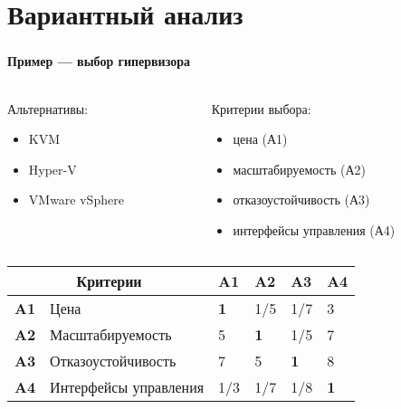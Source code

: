 
\section{Вариантный анализ}

\begin{frame}
\frametitle{\insertsection}
\framesubtitle{Пример --- выбор гипервизора}

\begin{columns}
    \begin{column}{0.45\textwidth}
        Альтернативы:
        \vspace{\baselineskip}
        \begin{itemize}
            \item KVM
            \item Hyper-V
            \item VMware vSphere
        \end{itemize}
    \end{column}
    \begin{column}{0.55\textwidth}
        Критерии выбора:
        \begin{itemize}
            \item цена (А1)
            \item масштабируемость (А2)
            \item отказоустойчивость (А3)
            \item интерфейсы управления (А4)
        \end{itemize}
    \end{column}
\end{columns}

\begin{table}
    \begin{tabular}{|l|l|l|l|l|l|}
      \hline \multicolumn{2}{|c|}{\textbf{Критерии}} & \textbf{A1} & \textbf{A2} & \textbf{A3} & \textbf{A4} \\
      \hline \textbf{A1} & Цена & \textbf{1} & 1/5 & 1/7 & 3 \\
      \hline \textbf{A2} & Масштабируемость & 5 & \textbf{1} & 1/5 & 7 \\
      \hline \textbf{A3} & Отказоустойчивость & 7 & 5 & \textbf{1} & 8 \\
      \hline \textbf{A4} & Интерфейсы управления & 1/3 & 1/7 & 1/8 & \textbf{1} \\
      \hline
    \end{tabular}
\end{table}
\end{frame}


